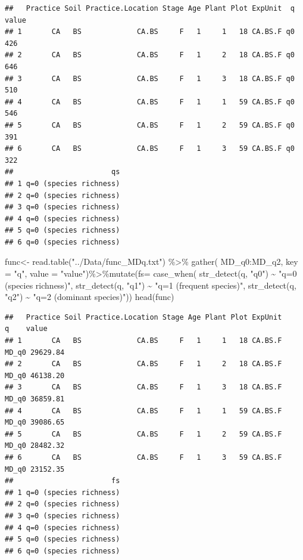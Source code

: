\documentclass[]{interact}
\theoremstyle{plain}%
\theoremstyle{definition}
\theoremstyle{remark}
\newenvironment{Shaded}{\begin{snugshade}}{\end{snugshade}}
\newcommand{\AttributeTok}[1]{\textcolor[rgb]{0.77,0.63,0.00}{#1}}
\newcommand{\FunctionTok}[1]{\textcolor[rgb]{0.00,0.00,0.00}{#1}}
\newcommand{\NormalTok}[1]{#1}
\newcommand{\OtherTok}[1]{\textcolor[rgb]{0.56,0.35,0.01}{#1}}
\newcommand{\SpecialCharTok}[1]{\textcolor[rgb]{0.00,0.00,0.00}{#1}}
\newcommand{\StringTok}[1]{\textcolor[rgb]{0.31,0.60,0.02}{#1}}
\begin{document}
\begin{verbatim}
##   Practice Soil Practice.Location Stage Age Plant Plot ExpUnit  q value
## 1       CA   BS             CA.BS     F   1     1   18 CA.BS.F q0   426
## 2       CA   BS             CA.BS     F   1     2   18 CA.BS.F q0   646
## 3       CA   BS             CA.BS     F   1     3   18 CA.BS.F q0   510
## 4       CA   BS             CA.BS     F   1     1   59 CA.BS.F q0   546
## 5       CA   BS             CA.BS     F   1     2   59 CA.BS.F q0   391
## 6       CA   BS             CA.BS     F   1     3   59 CA.BS.F q0   322
##                       qs
## 1 q=0 (species richness)
## 2 q=0 (species richness)
## 3 q=0 (species richness)
## 4 q=0 (species richness)
## 5 q=0 (species richness)
## 6 q=0 (species richness)
\end{verbatim}

\begin{Shaded}
\begin{Highlighting}[]
\NormalTok{func}\OtherTok{\textless{}{-}} \FunctionTok{read.table}\NormalTok{(}\StringTok{"../Data/func\_MDq.txt"}\NormalTok{) }\SpecialCharTok{\%\textgreater{}\%} \FunctionTok{gather}\NormalTok{(}
\NormalTok{  MD\_q0}\SpecialCharTok{:}\NormalTok{MD\_q2, }\AttributeTok{key =} \StringTok{"q"}\NormalTok{, }\AttributeTok{value =} \StringTok{"value"}\NormalTok{)}\SpecialCharTok{\%\textgreater{}\%}\FunctionTok{mutate}\NormalTok{(}\AttributeTok{fs=} \FunctionTok{case\_when}\NormalTok{(}
  \FunctionTok{str\_detect}\NormalTok{(q, }\StringTok{"q0"}\NormalTok{) }\SpecialCharTok{\textasciitilde{}} \StringTok{"q=0 (species richness)"}\NormalTok{,}
  \FunctionTok{str\_detect}\NormalTok{(q, }\StringTok{"q1"}\NormalTok{) }\SpecialCharTok{\textasciitilde{}} \StringTok{"q=1 (frequent species)"}\NormalTok{,}
  \FunctionTok{str\_detect}\NormalTok{(q, }\StringTok{"q2"}\NormalTok{) }\SpecialCharTok{\textasciitilde{}} \StringTok{"q=2 (dominant species)"}\NormalTok{))}
\FunctionTok{head}\NormalTok{(func) }
\end{Highlighting}
\end{Shaded}

\begin{verbatim}
##   Practice Soil Practice.Location Stage Age Plant Plot ExpUnit     q    value
## 1       CA   BS             CA.BS     F   1     1   18 CA.BS.F MD_q0 29629.84
## 2       CA   BS             CA.BS     F   1     2   18 CA.BS.F MD_q0 46138.20
## 3       CA   BS             CA.BS     F   1     3   18 CA.BS.F MD_q0 36859.81
## 4       CA   BS             CA.BS     F   1     1   59 CA.BS.F MD_q0 39086.65
## 5       CA   BS             CA.BS     F   1     2   59 CA.BS.F MD_q0 28482.32
## 6       CA   BS             CA.BS     F   1     3   59 CA.BS.F MD_q0 23152.35
##                       fs
## 1 q=0 (species richness)
## 2 q=0 (species richness)
## 3 q=0 (species richness)
## 4 q=0 (species richness)
## 5 q=0 (species richness)
## 6 q=0 (species richness)
\end{verbatim}
\end{document}

